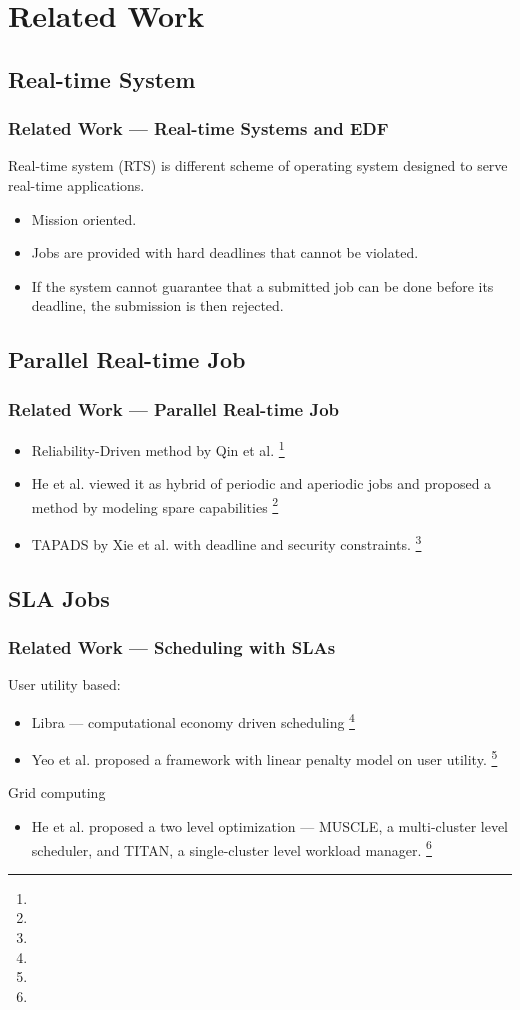 \section{Related Work}
\subsection{Real-time System}
\begin{frame}
  \frametitle{Related Work --- Real-time Systems and EDF}
  Real-time system (RTS) is different scheme of operating system
  designed to serve real-time applications.
  \begin{itemize}
    \item Mission oriented.
    \item Jobs are provided with hard deadlines that cannot be violated.
    \item If the system cannot guarantee that a submitted job can be
      done before its deadline, the submission is then rejected.
  \end{itemize}
\end{frame}
\subsection{Parallel Real-time Job}
\begin{frame}
  \frametitle{Related Work --- Parallel Real-time Job}
  \begin{itemize}
    \item Reliability-Driven method by Qin et al.
      \footnote[frame]{\tiny{}}
    \item He et al. viewed it as hybrid of periodic and aperiodic jobs
      and proposed a method by modeling spare capabilities
      \footnote[frame]{\tiny{}}
    \item TAPADS by Xie et al. with deadline and security constraints.
      \footnote[frame]{\tiny{}}
  \end{itemize}
\end{frame}
\subsection{SLA Jobs}
\begin{frame}
  \frametitle{Related Work --- Scheduling with SLAs}
  User utility based:
  \begin{itemize}
    \item Libra --- computational economy driven scheduling
      \footnote[frame]{\tiny{}}
    \item Yeo et al. proposed a framework with linear penalty model on
      user utility.
      \footnote[frame]{\tiny{}}
  \end{itemize}
  Grid computing
  \begin{itemize}
    \item He et al. proposed a two level optimization --- MUSCLE, a
      multi-cluster level scheduler, and TITAN, a single-cluster level
      workload manager.
      \footnote[frame]{\tiny{}}
  \end{itemize}
\end{frame}

